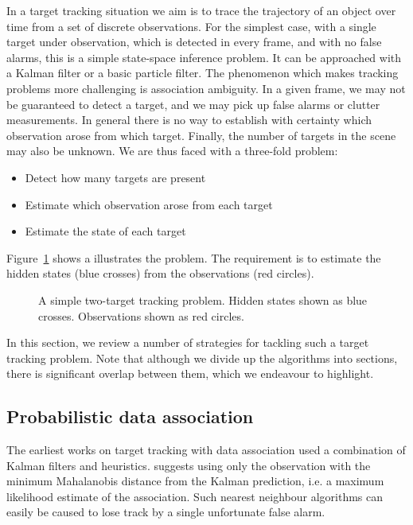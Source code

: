In a target tracking situation we aim is to trace the trajectory of an object over time from a set of discrete observations. For the simplest case, with a single target under observation, which is detected in every frame, and with no false alarms, this is a simple state-space inference problem. It can be approached with a Kalman filter or a basic particle filter. The phenomenon which makes tracking problems more challenging is association ambiguity. In a given frame, we may not be guaranteed to detect a target, and we may pick up false alarms or clutter measurements. In general there is no way to establish with certainty which observation arose from which target. Finally, the number of targets in the scene may also be unknown. We are thus faced with a three-fold problem:

\begin{itemize}
	\item Detect how many targets are present
	\item Estimate which observation arose from each target
	\item Estimate the state of each target
\end{itemize}

Figure~\ref{fig:BasicTracking} shows a illustrates the problem. The requirement is to estimate the hidden states (blue crosses) from the observations (red circles).

\begin{figure} \centering
%
\caption{A simple two-target tracking problem. Hidden states shown as blue crosses. Observations shown as red circles.}
\label{fig:BasicTracking}%
\end{figure}

In this section, we review a number of strategies for tackling such a target tracking problem. Note that although we divide up the algorithms into sections, there is significant overlap between them, which we endeavour to highlight.

\subsection{Probabilistic data association}
The earliest works on target tracking with data association used a combination of Kalman filters and heuristics. \cite{Sea1971} suggests using only the observation with the minimum Mahalanobis distance from the Kalman prediction, i.e. a maximum likelihood estimate of the association. Such nearest neighbour algorithms can easily be caused to lose track by a single unfortunate false alarm.

